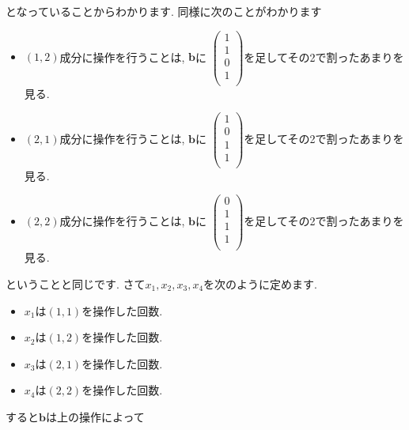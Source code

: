 \documentclass[dvipdfmx,a4paper,11pt]{article}
\theoremstyle{definition}
\begin{document}
 となっていることからわかります.
同様に次のことがわかります
\begin{itemize}
\item $(1,2)$成分に操作を行うことは, $\bm{b}$に
 $
 \begin{pmatrix}
1 \\
1\\
0\\
1\\
 \end{pmatrix}
 $を足してその2で割ったあまりを見る.
 \item $(2,1)$成分に操作を行うことは, $\bm{b}$に
 $
 \begin{pmatrix}
1 \\
0\\
1\\
1\\
 \end{pmatrix}
 $を足してその2で割ったあまりを見る.
 \item $(2,2)$成分に操作を行うことは, $\bm{b}$に
 $
 \begin{pmatrix}
0 \\
1\\
1\\
1\\
 \end{pmatrix}
 $を足してその2で割ったあまりを見る.
 \end{itemize}
 ということと同じです.
 さて$x_1, x_2, x_3, x_4$を次のように定めます.
 \begin{itemize}
 \item $x_1$は$(1,1)$を操作した回数.
 \item $x_2$は$(1,2)$を操作した回数.
  \item $x_3$は$(2,1)$を操作した回数.
  \item $x_4$は$(2,2)$を操作した回数.
 \end{itemize}
すると$\bm{b}$は上の操作によって
\end{document}
